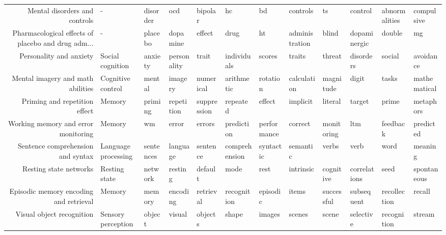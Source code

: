 \documentclass[english]{article}
\begin{document}
\begin{landscape}
\begin{supertabular}{rlllllllllll}
       Mental disorders and controls &                   - &         disorder &           ocd &         bipolar &             hc &          bd &       controls &            ts &        control & abnormalities &     compulsive \\
Pharmacological effects of placebo and drug adm... &                   - &          placebo &      dopamine &          effect &           drug &          ht & administration &         blind &   dopaminergic &        double &             mg \\
             Personality and anxiety &    Social cognition &          anxiety &   personality &           trait &    individuals &      scores &         traits &        threat &      disorders &        social &      avoidance \\
   Mental imagery and math abilities &   Cognitive control &           mental &       imagery &       numerical &     arithmetic &    rotation &    calculation &     magnitude &          digit &         tasks &   mathematical \\
       Priming and repetition effect &              Memory &          priming &    repetition &     suppression &       repeated &      effect &       implicit &       literal &         target &         prime &      metaphors \\
 Working memory and error monitoring &              Memory &               wm &         error &          errors &     prediction & performance &        correct &    monitoring &            ltm &      feedback &      predicted \\
   Sentence comprehension and syntax & Language processing &        sentences &      language &        sentence &  comprehension &   syntactic &       semantic &         verbs &           verb &          word &        meaning \\
              Resting state networks &       Resting state &          network &       resting &         default &           mode &        rest &      intrinsic &     cognitive &   correlations &          seed &    spontaneous \\
Episodic memory encoding and retrieval &              Memory &           memory &      encoding &       retrieval &    recognition &    episodic &          items &    successful &     subsequent &  recollection &         recall \\
           Visual object recognition &  Sensory perception &           object &        visual &         objects &          shape &      images &         scenes &         scene &      selective &   recognition &         stream \\

\end{supertabular}
\end{landscape}
\end{document}
